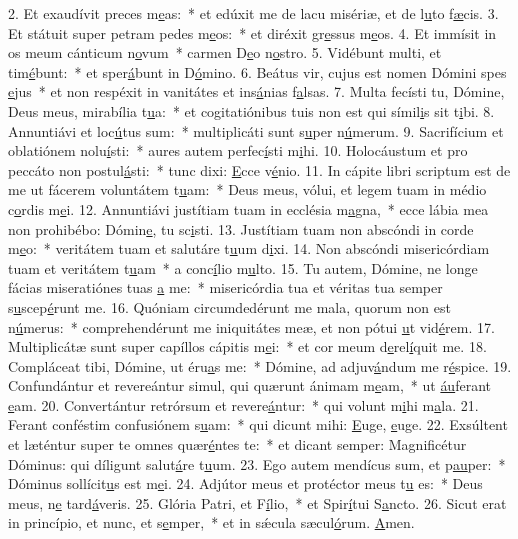 2. Et exaudívit preces m\uline{e}as:~* et edúxit me de lacu misériæ, et de l\uline{u}to f\uline{æ}cis.
3. Et státuit super petram pedes m\uline{e}os:~* et diréxit gr\uline{e}ssus m\uline{e}os.
4. Et immísit in os meum cánticum n\uline{o}vum~* carmen D\uline{e}o n\uline{o}stro.
5. Vidébunt multi, et tim\uline{é}bunt:~* et sper\uline{á}bunt in D\uline{ó}mino.
6. Beátus vir, cujus est nomen Dómini spes \uline{e}jus~* et non respéxit in vanitátes et ins\uline{á}nias f\uline{a}lsas.
7. Multa fecísti tu, Dómine, Deus meus, mirabília t\uline{u}a:~* et cogitatiónibus tuis non est qui símil\uline{i}s sit t\uline{i}bi.
8. Annuntiávi et loc\uline{ú}tus sum:~* multiplicáti sunt s\uline{u}per n\uline{ú}merum.
9. Sacrifícium et oblatiónem nolu\uline{í}sti:~* aures autem perfec\uline{í}sti m\uline{i}hi.
10. Holocáustum et pro peccáto non postul\uline{á}sti:~* tunc dixi: \uline{E}cce v\uline{é}nio.
11. In cápite libri scriptum est de me ut fácerem voluntátem t\uline{u}am:~* Deus meus, vólui, et legem tuam in médio c\uline{o}rdis m\uline{e}i.
12. Annuntiávi justítiam tuam in ecclésia m\uline{a}gna,~* ecce lábia mea non prohibébo: Dómin\uline{e}, tu sc\uline{i}sti.
13. Justítiam tuam non abscóndi in corde m\uline{e}o:~* veritátem tuam et salutáre t\uline{u}um d\uline{i}xi.
14. Non abscóndi misericórdiam tuam et veritátem t\uline{u}am~* a conc\uline{í}lio m\uline{u}lto.
15. Tu autem, Dómine, ne longe fácias miseratiónes tuas \uline{a} me:~* misericórdia tua et véritas tua semper s\uline{u}scep\uline{é}runt me.
16. Quóniam circumdedérunt me mala, quorum non est n\uline{ú}merus:~* comprehendérunt me iniquitátes meæ, et non pótui \uline{u}t vid\uline{é}rem.
17. Multiplicátæ sunt super capíllos cápitis m\uline{e}i:~* et cor meum d\uline{e}rel\uline{í}quit me.
18. Compláceat tibi, Dómine, ut éru\uline{a}s me:~* Dómine, ad adjuv\uline{á}ndum me r\uline{é}spice.
19. Confundántur et revereántur simul, qui quærunt ánimam m\uline{e}am,~* ut \uline{áu}ferant \uline{e}am.
20. Convertántur retrórsum et revere\uline{á}ntur:~* qui volunt m\uline{i}hi m\uline{a}la.
21. Ferant conféstim confusiónem s\uline{u}am:~* qui dicunt mihi: \uline{E}uge, \uline{e}uge.
22. Exsúltent et læténtur super te omnes quær\uline{é}ntes te:~* et dicant semper: Magnificétur Dóminus: qui díligunt salut\uline{á}re t\uline{u}um.
23. Ego autem mendícus sum, et p\uline{au}per:~* Dóminus sollícit\uline{u}s est m\uline{e}i.
24. Adjútor meus et protéctor meus t\uline{u} es:~* Deus meus, n\uline{e} tard\uline{á}veris.
25. Glória Patri, et F\uline{í}lio,~* et Spir\uline{í}tui S\uline{a}ncto.
26. Sicut erat in princípio, et nunc, et s\uline{e}mper,~* et in sǽcula sæcul\uline{ó}rum. \uline{A}men.
